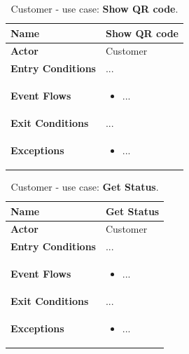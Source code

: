 \begin{table}[h!]
\centering
\begin{tabular}{| m{} | m{} |} 
	\hline
	\textbf{Name} & Show QR code \\ 
	\hline
	\textbf{Actor} & Customer \\ 
	\hline
	\textbf{Entry Conditions} & ... \\ 
	\hline
	\textbf{Event Flows} &
	\begin{itemize}
	\item ...
	\end{itemize} \\ 
	\hline
	\textbf{Exit Conditions} & ... \\ 
	\hline
	\textbf{Exceptions} &
	\begin{itemize}
	\item ...
	\end{itemize} \\ 
	\hline
\end{tabular}
\caption{Customer - use case: \textbf{Show QR code}.}
\label{tableLogIn}
\end{table}

\begin{table}[h!]
\centering
\begin{tabular}{| m{} | m{} |} 
	\hline
	\textbf{Name} & Get Status \\ 
	\hline
	\textbf{Actor} & Customer \\ 
	\hline
	\textbf{Entry Conditions} & ... \\ 
	\hline
	\textbf{Event Flows} &
	\begin{itemize}
	\item ...
	\end{itemize} \\ 
	\hline
	\textbf{Exit Conditions} & ... \\ 
	\hline
	\textbf{Exceptions} &
	\begin{itemize}
	\item ...
	\end{itemize} \\ 
	\hline
\end{tabular}
\caption{Customer - use case: \textbf{Get Status}.}
\label{tableLogIn}
\end{table}

